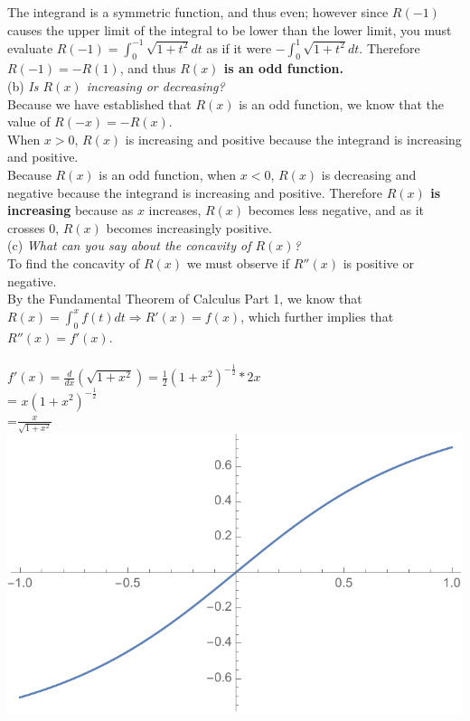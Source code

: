 \documentclass[12pt]{article}
\begin{document}
The integrand is a symmetric function, and thus even; however since $R(-1)$ causes the upper limit of the integral to be lower than the lower limit, you must evaluate $R(-1) = \int_{0}^{-1} \sqrt{1+t^2} dt $ as if it were $-\int_{0}^{1}\sqrt{1+t^2}dt$. Therefore $R(-1) = -R(1)$, and thus \textbf{$R(x)$ is an odd function.}
\\

\noindent (b) \textit{Is $R(x)$ increasing or decreasing?}\\
Because we have established that $R(x)$ is an odd function, we know that the value of $R(-x) = -R(x)$.\\
When $x>0$, $R(x)$ is increasing and positive because the integrand is increasing and positive.\\
Because $R(x)$ is an odd function, when $x<0$, $R(x)$ is decreasing and negative because the integrand is increasing and positive. 
Therefore \textbf{$R(x)$ is increasing} because as $x$ increases, $R(x)$ becomes less negative, and as it crosses 0, $R(x)$ becomes increasingly positive. \\

\noindent (c) \textit{What can you say about the concavity of $R(x)$?}\\
To find the concavity of $R(x)$ we must observe if $R''(x)$ is positive or negative. \\
By the Fundamental Theorem of Calculus Part 1, we know that $R(x) = \int_{0}^{x}f(t)dt \Rightarrow R'(x) = f(x)$, which further implies that $R''(x) = f'(x)$.\\
\\
$f'(x) = \frac{d}{dx}(\sqrt{1+x^2}) = \frac{1}{2}(1+x^2)^{-\frac{1}{2}}*2x$\\
= $x(1+x^2)^{-\frac{1}{2}}$\\
=$\frac{x}{\sqrt{1+x^2}}$ \\

\includegraphics[width=.45\textwidth]{c_graph.pdf}
\end{document}
